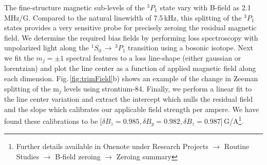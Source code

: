 The fine-structure magnetic sub-levels of the $^3P_1$ state vary with B-field as 2.1\,MHz/G.
Compared to the natural linewidth of 7.5\,kHz, this splitting of the $^3P_1$ states provides a very sensitive probe for precisely zeroing the residual magnetic field.
We determine the required bias fields by performing loss spectroscopy with unpolarized light along the $^1S_0\,\rightarrow\,^3P_1$ transition using a bosonic isotope.
Next we fit the $m_j=\pm1$ spectral features to a loss line-shape (either gaussian or lorentzian) and plot the line center as a function of applied magnetic field along each dimension.
Fig.\,\ref{fig:trimField}b) shows an example of the change in Zeeman splitting of the m$_j$ levels using strontium-84.
Finally, we perform a linear fit to the line center variation and extract the intercept which nulls the residual field and the slope which calibrates our applicable field strength per ampere. 
We have found these calibrations to be [$\delta B_z = 0.985, \delta B_y = 0.982, \delta B_z = 0.987$]\,G/A\footnote{Further details available in Onenote under Research Projects $\rightarrow$ Routine Studies $\rightarrow$ B-field zeroing $\rightarrow$ Zeroing summary}.

